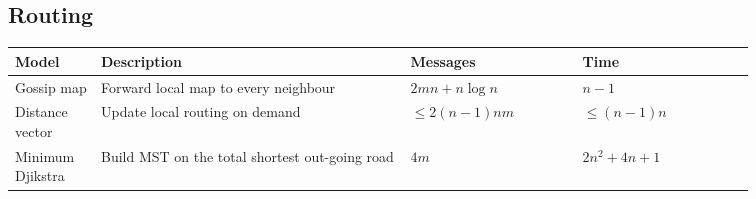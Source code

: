 \subsection{Routing}
\begin{table}[h]
\begin{tabular}{p{0.1\linewidth} p{0.36\linewidth} p{0.2\linewidth} p{0.2\linewidth}}
			\textbf{Model}		& \textbf{Description}						& \textbf{Messages}			& \textbf{Time} \\
	\hline 	Gossip map 			& Forward local map to every neighbour		& $2mn + n\log{n}$			& $n - 1$ \\
	\hline 	Distance vector 	& Update local routing on demand			& $\leq 2(n - 1)nm$			& $\leq (n - 1)n$ \\
	\hline 	Minimum Djikstra 	& Build MST on the total shortest out-going road
																			& $4m$						& $2n^2 + 4n + 1$ \\
\end{tabular}
\end{table}